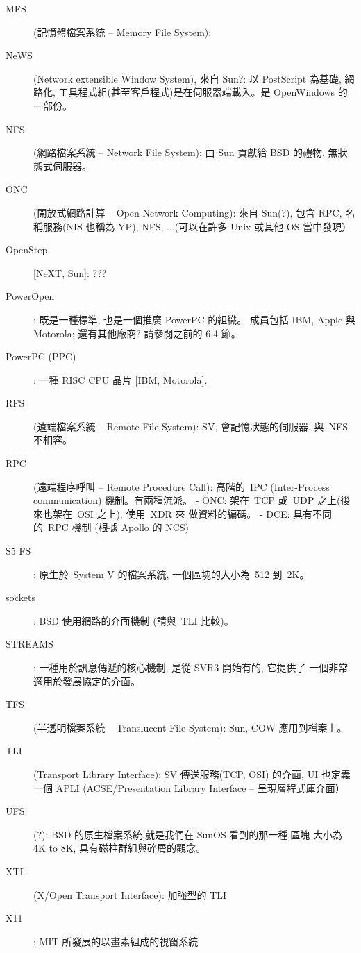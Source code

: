 \documentclass{article}
\begin{document}
\begin{CJK*}{Bg5}{ming}
\begin{description}
    \item [MFS](記憶體檔案系統 -- Memory File System):

    \item [NeWS](Network extensible Window System), 來自 Sun?: 以 PostScript 為基礎,
         網路化, 工具程式組(甚至客戶程式)是在伺服器端載入。是 OpenWindows 的
         一部份。

    \item [NFS] (網路檔案系統 -- Network File System):  由 Sun 貢獻給 BSD 的禮物,
         無狀態式伺服器。

    \item [ONC] (開放式網路計算 -- Open Network Computing): 來自 Sun(?), 包含 RPC, 
        名稱服務(NIS 也稱為 YP), NFS, ...(可以在許多 Unix 或其他 OS 當中發現）

    \item [OpenStep] [NeXT, Sun]: ???

    \item [PowerOpen]: 既是一種標準, 也是一個推廣 PowerPC 的組織。
         成員包括 IBM, Apple 與 Motorola; 還有其他廠商?
         請參閱之前的 6.4 節。

    \item [PowerPC (PPC)]: 一種 RISC CPU 晶片 [IBM, Motorola].

    \item [RFS] (遠端檔案系統 -- Remote File System):  SV, 會記憶狀態的伺服器,
         與~NFS 不相容。

    \item [RPC] (遠端程序呼叫 -- Remote Procedure Call): 高階的~IPC (Inter-Process
         communication) 機制。有兩種流派。
         - ONC: 架在~TCP 或~UDP 之上(後來也架在~OSI 之上), 使用~XDR 來
           做資料的編碼。
         - DCE: 具有不同的~RPC 機制 (根據 Apollo 的 NCS)

    \item [S5 FS]:  原生於~System V 的檔案系統, 一個區塊的大小為~512 到~2K。

    \item [sockets]:  BSD 使用網路的介面機制 (請與~TLI 比較)。

    \item [STREAMS]:  一種用於訊息傳遞的核心機制, 是從 SVR3 開始有的, 它提供了
         一個非常適用於發展協定的介面。

    \item [TFS] (半透明檔案系統 -- Translucent File System): Sun, COW 應用到檔案上。

    \item [TLI] (Transport Library Interface):  SV 傳送服務(TCP, OSI) 的介面,
         UI 也定義一個 APLI (ACSE/Presentation Library Interface --
         呈現層程式庫介面）

    \item [UFS] (?): BSD 的原生檔案系統,就是我們在 SunOS 看到的那一種,區塊
         大小為 4K to 8K, 具有磁柱群組與碎屑的觀念。

    \item [XTI] (X/Open Transport Interface):  加強型的 TLI

    \item [X11]: MIT 所發展的以畫素組成的視窗系統
\end{description}
\end{CJK*}
\end{document}
